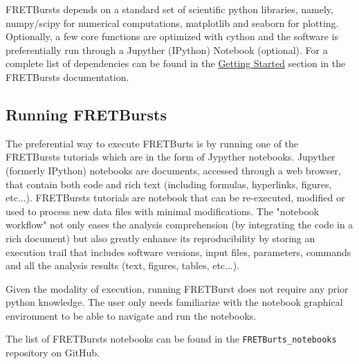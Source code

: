FRETBursts depends on a standard set of scientific 
python libraries, namely, numpy/scipy for numerical computations, 
matplotlib and seaborn for plotting. Optionally, a few core functions are
optimized with cython and the software is preferentially run through
a Jupyther (IPython) Notebook (optional).
For a complete list of dependencies can be found in the 
\href{http://fretbursts.readthedocs.org/en/latest/getting_started.html}{Getting Started}
section in the FRETBursts documentation.

\subsection{Running FRETBursts}
The preferential way to execute FRETBurts is by running one of the
FRETBursts tutorials which are in the form of Jypyther notebooks.
Jupyther (formerly IPython) notebooks are documents, 
accessed through a web browser, that contain both code and 
rich text (including formulas, hyperlinks, figures, etc...).
FRETBursts tutorials are notebook that can be re-executed,
modified or used to process new data files with minimal modifications.
The "notebook workflow"\cite{Shen_2014} not only eases 
the analysis comprehension (by integrating the code in a rich document)
but also greatly enhance its reproducibility by storing an execution trail
that includes software versions, input files, parameters, commands and all
the analysis results (text, figures, tables, etc...).

Given the modality of execution, running FRETBurst does not require
any prior python knowledge. The user only needs familiarize with the
notebook graphical environment to be able to navigate and run the notebooks.

The list of FRETBursts notebooks can be found in the 
\verb|FRETBurts_notebooks| repository on GitHub.